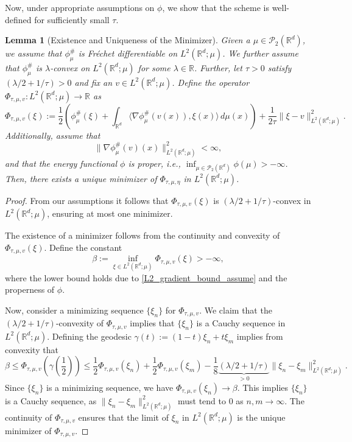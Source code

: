 \documentclass[11pt,a4paper]{amsart}
\newcommand{\1}{\mathds{1}}
\newcommand{\R}{{\mathbb R}}
\newtheorem{lemma}[theorem]{\textbf{Lemma}}
\numberwithin{equation}{section}
\begin{document}
Now, under appropriate assumptions on $\phi$, we show that the scheme is well-defined for sufficiently small $\tau$.

\begin{lemma}[Existence and Uniqueness of the Minimizer] \label{min_exist} Given a $\mu \in \mathcal{P}_{2}(\R^d)$, we assume that $\phi^{\#}_{\mu}$ is Fr\'echet differentiable on $L^2(\R^d;\mu)$. We further assume that $\phi^{\#}_{\mu}$ is $\lambda$-convex on $L^2(\R^d;\mu)$ for some $\lambda \in \R$. Further, let $\tau > 0$ satisfy $(\lambda / 2 + 1 / \tau) > 0$ and fix an $v \in L^2(\mathbb{R}^d; \mu)$. Define the operator $\Phi_{\tau, \mu, v}: L^2(\mathbb{R}^d; \mu) \to \mathbb{R}$ as
\[
\Phi_{\tau, \mu, v}(\xi) := \frac{1}{2} \left(\phi^{\#}_{\mu}(\xi) + \int_{\mathbb{R}^d} \langle \nabla \phi^{\#}_{\mu}( v(x)), \xi(x) \rangle \, d\mu(x) \right) + \frac{1}{2 \tau} \|\xi - v\|^2_{L^2(\mathbb{R}^d; \mu)}.
\]
\noindent Additionally, assume that
\begin{equation}
\| \nabla \phi^{\#}_{\mu}(v)(x) \|^2_{L^2(\mathbb{R}^d; \mu)} < \infty, \label{L2_gradient_bound_assume}
\end{equation}
and that the energy functional $\phi$ is proper, i.e., $\inf_{\mu \in \mathcal{P}_2(\mathbb{R}^d)} \phi(\mu) > -\infty$. Then, there exists a unique minimizer of $\Phi_{\tau, \mu, \eta}$ in $L^2(\mathbb{R}^d; \mu)$.
\end{lemma}

\begin{proof} 
From our assumptions it follows that $\Phi_{\tau, \mu,v}(\xi)$ is $(\lambda/2 + 1/\tau)$-convex in $L^2(\mathbb{R}^d; \mu)$, ensuring at most one minimizer. 

The existence of a minimizer follows from the continuity and convexity of $\Phi_{\tau, \mu,v}(\xi)$. Define the constant 
\[
\beta := \inf_{\xi \in L^2(\mathbb{R}^d; \mu)} \Phi_{\tau, \mu,v}(\xi) > -\infty,
\]
where the lower bound holds due to \eqref{L2_gradient_bound_assume} and the properness of $\phi$.

Now, consider a minimizing sequence $\{\xi_n\}$ for $\Phi_{\tau,\mu,v}$. We claim that the $(\lambda/2 + 1/\tau)$-convexity of $\Phi_{\tau,\mu,v}$ implies that $\{\xi_n\}$ is a Cauchy sequence in $L^2(\mathbb{R}^d; \mu)$. Defining the geodesic $\gamma(t) := (1-t) \xi_n + t \xi_m$ implies from convexity that
\[
\beta \leq \Phi_{\tau, \mu, v}\left(\gamma\left(\frac{1}{2}\right)\right) 
\leq \frac{1}{2} \Phi_{\tau, \mu, v}(\xi_n) + \frac{1}{2} \Phi_{\tau, \mu, v}(\xi_m) - \frac{1}{8} \underbrace{(\lambda/2 + 1/\tau)}_{> 0} \|\xi_n - \xi_m\|^2_{L^2(\mathbb{R}^d; \mu)}.
\]
Since $\{\xi_n\}$ is a minimizing sequence, we have $\Phi_{\tau, \mu, v}(\xi_n) \to \beta$. This implies $\{\xi_n\}$ is a Cauchy sequence, as $\|\xi_n - \xi_m\|^2_{L^2(\mathbb{R}^d; \mu)}$ must tend to 0 as $n, m \to \infty$. The continuity of $\Phi_{\tau, \mu, v}$ ensures that the limit of $\xi_n$ in $L^2(\mathbb{R}^d; \mu)$ is the unique minimizer of $\Phi_{\tau, \mu,v}$.
\end{proof}
\end{document}
